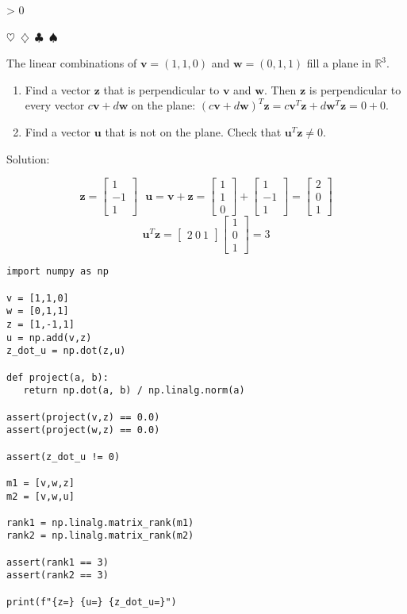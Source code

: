 \documentclass{article}
\newcommand{\sep}{\begin{center}$\heartsuit$~$\diamondsuit$~$\clubsuit$~$\spadesuit$\end{center}}
\newcommand{\sol}{\begin{center}\small{Solution:}\end{center}}
\newcommand{\vect}[1]{\ensuremath{\boldsymbol{#1}}}
\newcounter{prblm}
\newcommand{\problem}[1]{
  \ifnum\value{prblm} > 0 \sep \fi
  \stepcounter{prblm}
  \noindent\textbf{\arabic{prblm}} #1
  \sol
}
\begin{document}
\problem{The linear combinations of $\vect{v} = (1, 1, 0)$ and $\vect{w} = (0, 1, 1)$ fill a plane in $\mathbb{R}^3$.
\begin{enumerate}[label=(\alph*)]
\item Find a vector $\vect{z}$ that is perpendicular to $\vect{v}$ and $\vect{w}$. Then $\vect{z}$ is perpendicular to every vector $c\vect{v} + d\vect{w}$ on the plane: $(c\vect{v} + d\vect{w})^T \vect{z} = c\vect{v}^T\vect{z} + d\vect{w}^T\vect{z} = 0 + 0$. 
\item Find a vector $\vect{u}$ that is not on the plane. Check that $\vect{u}^T\vect{z} \not= 0$.
\end{enumerate}}


\begin{displaymath}
  \vect{z} = \begin{bmatrix} 1 \\ -1 \\ 1 \end{bmatrix}
  ~~~
  \vect{u} = \vect{v} + \vect{z} = \begin{bmatrix} 1 \\ 1 \\ 0 \end{bmatrix} + \begin{bmatrix} 1 \\ -1 \\ 1 \end{bmatrix} = \begin{bmatrix} 2 \\ 0 \\ 1 \end{bmatrix}
\end{displaymath}
\begin{displaymath}
  \vect{u}^T\vect{z} = \begin{bmatrix} 2 ~ 0 ~ 1 \end{bmatrix} \begin{bmatrix} 1 \\ 0 \\ 1 \end{bmatrix} = 3
\end{displaymath}

\begin{verbatim}
import numpy as np

v = [1,1,0]
w = [0,1,1]
z = [1,-1,1]
u = np.add(v,z)
z_dot_u = np.dot(z,u)

def project(a, b):
   return np.dot(a, b) / np.linalg.norm(a)

assert(project(v,z) == 0.0)
assert(project(w,z) == 0.0)

assert(z_dot_u != 0)

m1 = [v,w,z]
m2 = [v,w,u]

rank1 = np.linalg.matrix_rank(m1)
rank2 = np.linalg.matrix_rank(m2)

assert(rank1 == 3)
assert(rank2 == 3)

print(f"{z=} {u=} {z_dot_u=}")
\end{verbatim}
\end{document}
